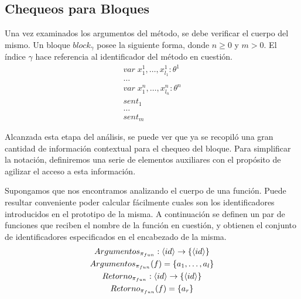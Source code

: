 \documentclass{article}
\begin{document}
\begin{prooftree}
\end{prooftree}

\begin{prooftree}
\end{prooftree}

\subsection{Chequeos para Bloques}

Una vez examinados los argumentos del método, se debe verificar el cuerpo del mismo.
Un bloque $block_\gamma$ posee la siguiente forma, donde $n \geq 0$ y $m > 0$.
El índice $\gamma$ hace referencia al identificador del método en cuestión.
\begin{gather*}
var \; x^1_1, \ldots, x^1_{l_1}: \theta^1
\\
\ldots
\\
var \; x^n_1, \ldots, x^n_{l_n}: \theta^n
\\
sent_1
\\
\ldots
\\
sent_m
\end{gather*}

Alcanzada esta etapa del análisis, se puede ver que ya se recopiló una gran cantidad de información contextual para el chequeo del bloque.
Para simplificar la notación, definiremos una serie de elementos auxiliares con el propósito de agilizar el acceso a esta información.

Supongamos que nos encontramos analizando el cuerpo de una función.
Puede resultar conveniente poder calcular fácilmente cuales son los identificadores introducidos en el prototipo de la misma.
A continuación se definen un par de funciones que reciben el nombre de la función en cuestión, y obtienen el conjunto de identificadores especificados en el encabezado de la misma.
\begin{gather*}
Argumentos_{\pi_{fun}}: \SY{id} \RA \{ \SY{id} \}
\\
Argumentos_{\pi_{fun}}(f) = \{ a_1, \ldots, a_l \}
\\
Retorno_{\pi_{fun}}: \SY{id} \RA \{ \SY{id} \}
\\
Retorno_{\pi_{fun}}(f) = \{ a_r \}
\end{gather*}
\end{document}
